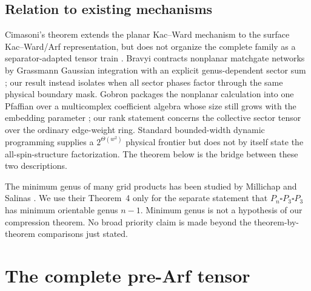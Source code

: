 \documentclass[11pt]{article}
\begin{document}
\subsection{Relation to existing mechanisms}

Cimasoni's theorem extends the planar Kac--Ward mechanism
\cite{KacWard1952} to the surface Kac--Ward/Arf representation, but does
not organize the complete family as a separator-adapted tensor train
\cite{Cimasoni2010}.  Bravyi contracts nonplanar matchgate networks by
Grassmann Gaussian integration with an explicit genus-dependent sector sum
\cite{Bravyi2009}; our result instead isolates when all sector phases factor
through the same physical boundary mask.  Gobron packages the nonplanar
calculation into one Pfaffian over a multicomplex coefficient algebra whose
size still grows with the embedding parameter \cite[Theorem~3.2 and
Corollary~3.4]{Gobron2013}; our rank statement concerns the collective sector
tensor over the ordinary edge-weight ring.  Standard bounded-width dynamic
programming supplies a \(2^{\Theta(w^2)}\) physical frontier but does not by
itself state the all-spin-structure factorization.  The theorem below is the
bridge between these two descriptions.

The minimum genus of many grid products has been studied by Millichap and
Salinas \cite{MillichapSalinas2022}.  We use their Theorem~4 only for the
separate statement that \(P_n\square P_3\square P_3\) has minimum orientable
genus \(n-1\).  Minimum genus is not a hypothesis of our compression theorem.
No broad priority claim is made beyond the theorem-by-theorem comparisons
just stated.

\section{The complete pre-Arf tensor}
\end{document}
